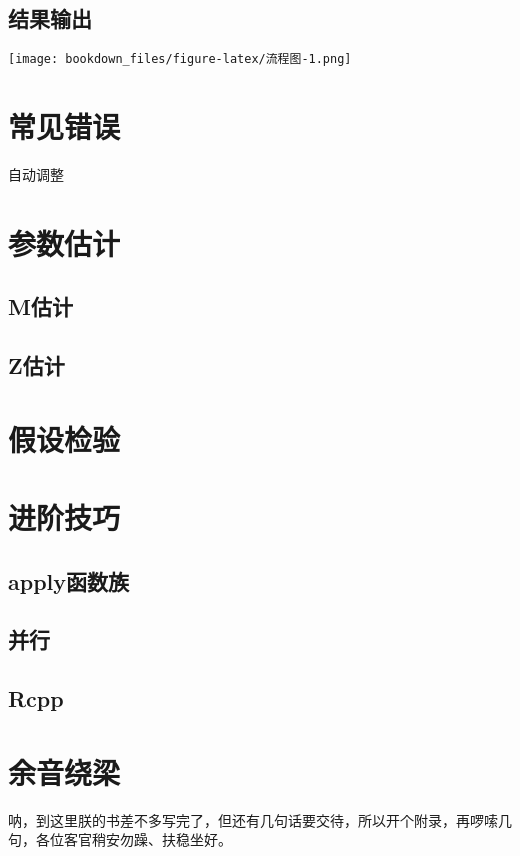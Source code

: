 \documentclass[]{ctexbook}
\begin{document}
\hypertarget{section-7}{%
\section{结果输出}\label{section-7}}

\texttt{[image: bookdown\_files/figure-latex/流程图-1.png]}

\hypertarget{section-8}{%
\chapter{常见错误}\label{section-8}}

自动调整

\hypertarget{section-9}{%
\chapter{参数估计}\label{section-9}}

\hypertarget{m}{%
\section{M估计}\label{m}}

\hypertarget{z}{%
\section{Z估计}\label{z}}

\hypertarget{section-10}{%
\chapter{假设检验}\label{section-10}}

\hypertarget{section-11}{%
\chapter{进阶技巧}\label{section-11}}

\hypertarget{apply}{%
\section{apply函数族}\label{apply}}

\hypertarget{section-12}{%
\section{并行}\label{section-12}}

\hypertarget{rcpp}{%
\section{Rcpp}\label{rcpp}}

\cleardoublepage

\hypertarget{appendix-}{%
\appendix {}}


\hypertarget{sound}{%
\chapter{余音绕梁}\label{sound}}

呐，到这里朕的书差不多写完了，但还有几句话要交待，所以开个附录，再啰嗦几句，各位客官稍安勿躁、扶稳坐好。



\backmatter
\printindex
\end{document}
